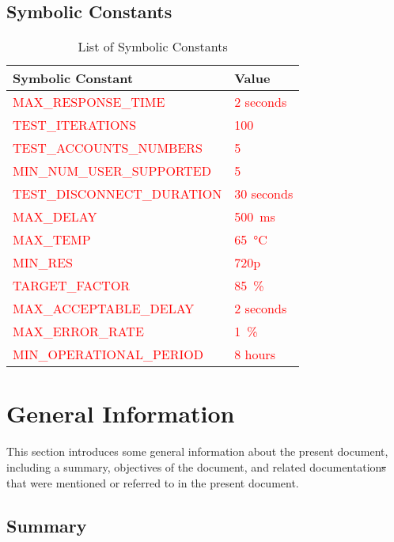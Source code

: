 \documentclass[12pt, titlepage]{article}
\newcommand{\rt}[1]{\textcolor{red}{#1}}
\begin{document}
\subsection{Symbolic Constants}\label{sec:symbolic-constants}
\begin{table}[H]
  \centering
  \begin{tabularx}{\linewidth}{lX} 
    \toprule
    \textbf{Symbolic Constant} & \textbf{Value} \\
    \midrule
    \rt{MAX\_RESPONSE\_TIME} & \rt{2 seconds}\\
    \rt{TEST\_ITERATIONS} & \rt{100}\\
    \rt{TEST\_ACCOUNTS\_NUMBERS} & \rt{5}\\
    \rt{MIN\_NUM\_USER\_SUPPORTED} & \rt{5}\\
    \rt{TEST\_DISCONNECT\_DURATION} & \rt{30 seconds}\\

    \rt{MAX\_DELAY}  & \rt{\SI{500}{\milli\second}} \\
    \rt{MAX\_TEMP}  & \rt{\SI{65}{\degreeCelsius}} \\
    \rt{MIN\_RES}  & \rt{720p} \\
    \rt{TARGET\_FACTOR}  & \rt{\SI{85}{\percent}} \\

    \rt{MAX\_ACCEPTABLE\_DELAY}  & \rt{2 seconds} \\
    \rt{MAX\_ERROR\_RATE}  & \rt{\SI{1}{\percent}} \\
    \rt{MIN\_OPERATIONAL\_PERIOD}  & \rt{8 hours} \\
    \bottomrule
  \end{tabularx}
  \caption{List of Symbolic Constants}
  \label{tab:symbolic-constants}
\end{table}

\newpage
{}

\section{General Information}

This section introduces some general information about the present document,
including a summary, objectives of the document, and related documentation\sout{s} that
were mentioned or referred to in the present document.

\subsection{Summary}
\end{document}

